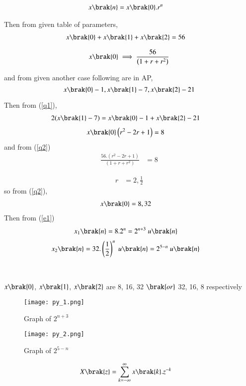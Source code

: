 \documentclass[beamer]{IEEEtran}
\theoremstyle{remark}
\begin{document}
\begin{align}
\label{e1}
x\brak{n}&=x\brak{0}.r^{n}
\end{align}

Then from given table of parameters,
\begin{align}
x\brak{0}+x\brak{1}+x\brak{2}&=56
\end{align}

\begin{align}
\label{q2}
x\brak{0}\implies\frac{56}{\left(1+r+r^2\right)}
\end{align}

and from given another case following are in AP,
$$
x\brak{0}-1,x\brak{1}-7,x\brak{2}-21
$$

Then from (\ref{q1}),
\begin{align}2(x\brak{1}-7)&=x\brak{0}-1+x\brak{2}-21\end{align}
\begin{align}x\brak{0}\left(r^2-2r+1\right)&=8\end{align}
and from (\ref{q2})
\begin{align}\frac{56.\left(r^2-2r+1\right)}{\left(1+r+r^2\right)}&=8\end{align}

\begin{align}
\label{q3}
r&=2,\frac{1}{2}
\end{align}
so from (\ref{q2}),
\begin{align}x\brak{0}&=8,32\end{align}
Then from (\ref{e1})
\begin{align}
    \label{a11}
    x_{1}\brak{n}&=8.2^{n}=2^{n+3}\ u\brak{n}
\end{align}
\begin{align}
    \label{a12}
    x_{2}\brak{n}=32.\left(\frac{1}{2}\right)^{n}\ u\brak{n}&=2^{5-n}\ u\brak{n}
\end{align}\\\\
$x\brak{0}$, $x\brak{1}$, $x\brak{2}$ are 8, 16, 32 $\brak{or}$ 32, 16, 8 respectively
\begin{figure}[h]
    \centering
    \texttt{[image: py\_1.png]}
    \label{$2^{n+3}$}
    \caption*{Graph of $2^{n+3}$ }
\end{figure}
\begin{figure}[h]
    \centering
    \texttt{[image: py\_2.png]}
    \caption*{Graph of $2^{5-n}$}
    \label{$2^{5-n}$}
\end{figure}
\begin{align}
\label{a13}
    X\brak{z}&=\sum_{k=-\infty}^{\infty} x\brak{k}.z^{-k}
\end{align}
\end{document}
